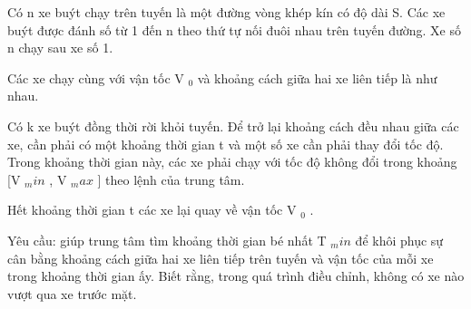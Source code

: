 Có n xe buýt chạy trên tuyến là một đường vòng khép kín có độ dài S. Các xe buýt được đánh số từ 1 đến n theo thứ tự nối đuôi nhau trên tuyến đường. Xe số n chạy sau xe số 1.  

   Các xe chạy cùng với vận tốc V   $_    0   $   và khoảng cách giữa hai xe liên tiếp là như nhau.  

   Có k xe buýt đồng thời rời khỏi tuyến. Để trở lại khoảng cách đều nhau giữa các xe, cần phải có một khoảng thời gian t và một số xe cần phải thay   đổi tốc độ. Trong khoảng thời gian này, các xe phải chạy với tốc độ không đổi trong khoảng [V   $_    min   $   , V   $_    max   $   ] theo lệnh của   trung tâm.  

   Hết khoảng thời gian t các xe lại quay về vận tốc V   $_    0   $   .  

   Yêu cầu: giúp trung tâm tìm khoảng thời gian bé nhất T   $_    min   $   để khôi phục sự cân bằng khoảng cách giữa hai xe liên tiếp trên tuyến và   vận tốc của mỗi xe trong khoảng thời gian ấy. Biết rằng, trong quá trình điều chỉnh, không có xe nào vượt qua xe trước mặt.